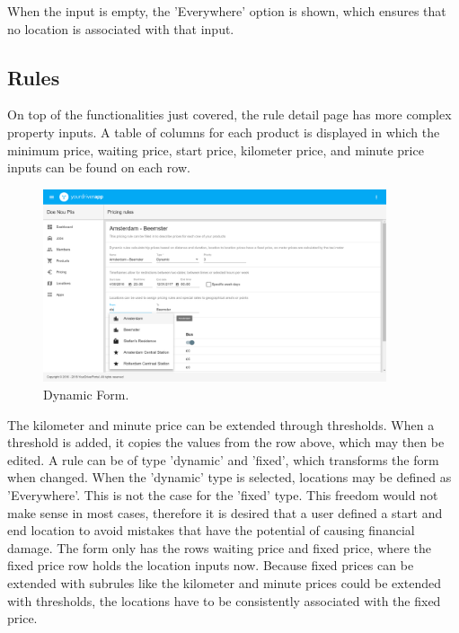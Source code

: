 When the input is empty, the 'Everywhere' option is shown, which ensures that no location is associated with that input.

\subsection{Rules}
On top of the functionalities just covered, the rule detail page has more complex property inputs. A table of columns for each product is displayed in which the minimum price, waiting price, start price, kilometer price, and minute price inputs can be found on each row.

\begin{figure}[H]
	\centering
	\includegraphics[width=0.9\textwidth]{Rules}
	\caption[Dynamic Form]{Dynamic Form.}
	\label{fig:Dynamic Form}
\end{figure}

The kilometer and minute price can be extended through thresholds. When a threshold is added, it copies the values from the row above, which may then be edited. A rule can be of type 'dynamic' and 'fixed', which transforms the form when changed. When the 'dynamic' type is selected, locations may be defined as 'Everywhere'. This is not the case for the 'fixed' type. This freedom would not make sense in most cases, therefore it is desired that a user defined a start and end location to avoid mistakes that have the potential of causing financial damage. The form only has the rows waiting price and fixed price, where the fixed price row holds the location inputs now. Because fixed prices can be extended with subrules like the kilometer and minute prices could be extended with thresholds, the locations have to be consistently associated with the fixed price.

